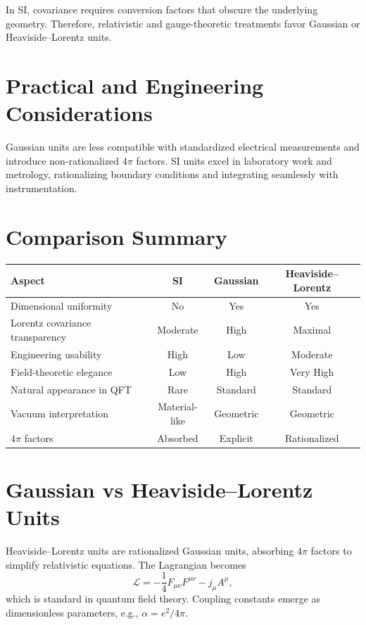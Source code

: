 \documentclass[aps,prd,preprint,superscriptaddress,nofootinbib]{revtex4-2}
\begin{document}
In SI, covariance requires conversion factors that obscure the underlying geometry. Therefore, relativistic and gauge-theoretic treatments favor Gaussian or Heaviside--Lorentz units.

\section{Practical and Engineering Considerations}

Gaussian units are less compatible with standardized electrical measurements and introduce non-rationalized $4\pi$ factors. SI units excel in laboratory work and metrology, rationalizing boundary conditions and integrating seamlessly with instrumentation.

\section{Comparison Summary}

\begin{center}
\begin{tabular}{lccc}
\hline
Aspect & SI & Gaussian & Heaviside--Lorentz \\
\hline
Dimensional uniformity & No & Yes & Yes \\
Lorentz covariance transparency & Moderate & High & Maximal \\
Engineering usability & High & Low & Moderate \\
Field-theoretic elegance & Low & High & Very High \\
Natural appearance in QFT & Rare & Standard & Standard \\
Vacuum interpretation & Material-like & Geometric & Geometric \\
$4\pi$ factors & Absorbed & Explicit & Rationalized \\
\hline
\end{tabular}
\end{center}

\section{Gaussian vs Heaviside--Lorentz Units}

Heaviside--Lorentz units are rationalized Gaussian units, absorbing $4\pi$ factors to simplify relativistic equations. The Lagrangian becomes
\[
\mathcal{L} = -\frac{1}{4} F_{\mu\nu}F^{\mu\nu} - j_\mu A^\mu,
\]
which is standard in quantum field theory. Coupling constants emerge as dimensionless parameters, e.g., $\alpha = e^2 / 4\pi$.
\end{document}
